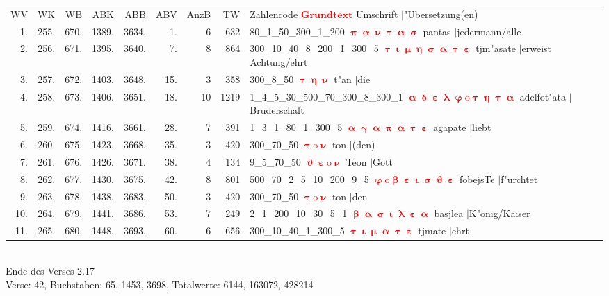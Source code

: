 \documentclass[a4paper,10pt,landscape]{article}
\begin{document}
\begin{tabular}{rrrrrrrrp{120mm}}
WV&WK&WB&ABK&ABB&ABV&AnzB&TW&Zahlencode \textcolor{red}{$\boldsymbol{Grundtext}$} Umschrift $|$"Ubersetzung(en)\\
1.&255.&670.&1389.&3634.&1.&6&632&80\_1\_50\_300\_1\_200 \textcolor{red}{$\boldsymbol{\uppi\upalpha\upnu\uptau\upalpha\upsigma}$} pantas $|$jedermann/alle\\
2.&256.&671.&1395.&3640.&7.&8&864&300\_10\_40\_8\_200\_1\_300\_5 \textcolor{red}{$\boldsymbol{\uptau\upiota\upmu\upeta\upsigma\upalpha\uptau\upepsilon}$} tjm"asate $|$erweist Achtung/ehrt\\
3.&257.&672.&1403.&3648.&15.&3&358&300\_8\_50 \textcolor{red}{$\boldsymbol{\uptau\upeta\upnu}$} t"an $|$die\\
4.&258.&673.&1406.&3651.&18.&10&1219&1\_4\_5\_30\_500\_70\_300\_8\_300\_1 \textcolor{red}{$\boldsymbol{\upalpha\updelta\upepsilon\uplambda\upvarphi\mathrm{o}\uptau\upeta\uptau\upalpha}$} adelfot"ata $|$Bruderschaft\\
5.&259.&674.&1416.&3661.&28.&7&391&1\_3\_1\_80\_1\_300\_5 \textcolor{red}{$\boldsymbol{\upalpha\upgamma\upalpha\uppi\upalpha\uptau\upepsilon}$} agapate $|$liebt\\
6.&260.&675.&1423.&3668.&35.&3&420&300\_70\_50 \textcolor{red}{$\boldsymbol{\uptau\mathrm{o}\upnu}$} ton $|$(den)\\
7.&261.&676.&1426.&3671.&38.&4&134&9\_5\_70\_50 \textcolor{red}{$\boldsymbol{\upvartheta\upepsilon\mathrm{o}\upnu}$} Teon $|$Gott\\
8.&262.&677.&1430.&3675.&42.&8&801&500\_70\_2\_5\_10\_200\_9\_5 \textcolor{red}{$\boldsymbol{\upvarphi\mathrm{o}\upbeta\upepsilon\upiota\upsigma\upvartheta\upepsilon}$} fobejsTe $|$f"urchtet\\
9.&263.&678.&1438.&3683.&50.&3&420&300\_70\_50 \textcolor{red}{$\boldsymbol{\uptau\mathrm{o}\upnu}$} ton $|$den\\
10.&264.&679.&1441.&3686.&53.&7&249&2\_1\_200\_10\_30\_5\_1 \textcolor{red}{$\boldsymbol{\upbeta\upalpha\upsigma\upiota\uplambda\upepsilon\upalpha}$} basjlea $|$K"onig/Kaiser\\
11.&265.&680.&1448.&3693.&60.&6&656&300\_10\_40\_1\_300\_5 \textcolor{red}{$\boldsymbol{\uptau\upiota\upmu\upalpha\uptau\upepsilon}$} tjmate $|$ehrt\\
\end{tabular}\medskip \\
Ende des Verses 2.17\\
Verse: 42, Buchstaben: 65, 1453, 3698, Totalwerte: 6144, 163072, 428214\\
\end{document}

